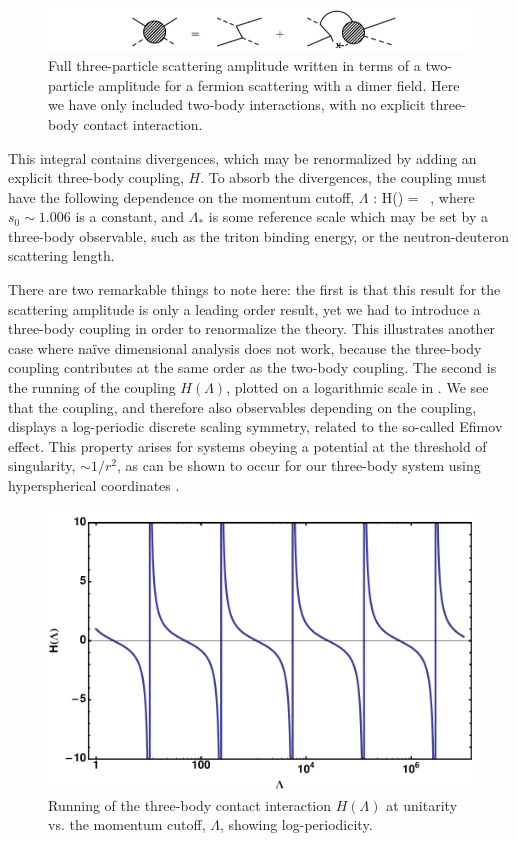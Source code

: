 \begin{figure}
\caption{\label{fig:3bodyint}Full three-particle scattering amplitude written in terms of a two-particle amplitude for a fermion scattering with a dimer field. Here we have only included two-body interactions, with no explicit three-body contact interaction.}
\includegraphics[width=\linewidth]{Chapter5-figures/3body}
    \end{figure}

This integral contains divergences, which may be renormalized by adding an explicit three-body coupling, $H$. To absorb the divergences, the coupling must have the following dependence on the momentum cutoff, $\Lambda$ \cite{Bedaque:1998km,Bedaque:1998kg,Beane:2000wh}:
\beq
H(\Lambda) =  \ ,
\eeq
where $s_0 \sim 1.006$ is a constant, and $\Lambda_{*}$ is some reference scale which may be set by a three-body observable, such as the triton binding energy, or the neutron-deuteron scattering length. 

There are two remarkable things to note here: the first is that this result for the scattering amplitude is only a leading order result, yet we had to introduce a three-body coupling in order to renormalize the theory. This illustrates another case where na\"ive dimensional analysis does not work, because the three-body coupling contributes at the same order as the two-body coupling. The second is the running of the coupling $H(\Lambda)$, plotted on a logarithmic scale in . We see that the coupling, and therefore also observables depending on the coupling, displays a log-periodic discrete scaling symmetry, related to the so-called Efimov effect. This property arises for systems obeying a potential at the threshold of singularity, $\sim 1/r^2$, as can be shown to occur for our three-body system using hyperspherical coordinates \cite{V1970563,Efimov:1971zz}.

\begin{figure}
\caption{\label{fig:HLambda}Running of the three-body contact interaction $H(\Lambda)$ at unitarity vs. the momentum cutoff, $\Lambda$, showing log-periodicity.}
\includegraphics[width=0.5\linewidth]{Chapter5-figures/HLambda.pdf}
\end{figure}

